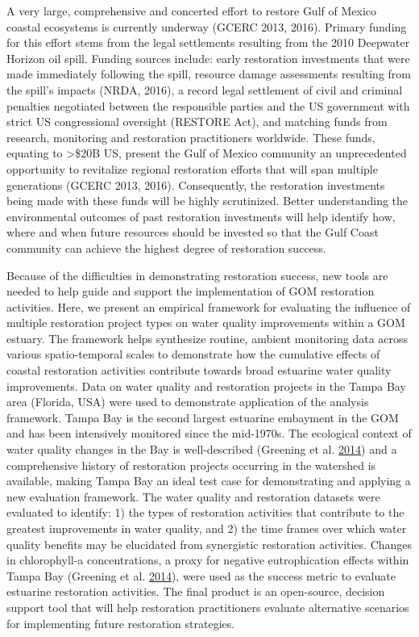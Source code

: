 \documentclass[]{article}
\begin{document}
A very large, comprehensive and concerted effort to restore Gulf of
Mexico coastal ecosystems is currently underway (GCERC 2013, 2016).
Primary funding for this effort stems from the legal settlements
resulting from the 2010 Deepwater Horizon oil spill. Funding sources
include: early restoration investments that were made immediately
following the spill, resource damage assessments resulting from the
spill's impacts (NRDA, 2016), a record legal settlement of civil and
criminal penalties negotiated between the responsible parties and the US
government with strict US congressional oversight (RESTORE Act), and
matching funds from research, monitoring and restoration practitioners
worldwide. These funds, equating to \textgreater{}\$20B US, present the
Gulf of Mexico community an unprecedented opportunity to revitalize
regional restoration efforts that will span multiple generations (GCERC
2013, 2016). Consequently, the restoration investments being made with
these funds will be highly scrutinized. Better understanding the
environmental outcomes of past restoration investments will help
identify how, where and when future resources should be invested so that
the Gulf Coast community can achieve the highest degree of restoration
success.

Because of the difficulties in demonstrating restoration success, new
tools are needed to help guide and support the implementation of GOM
restoration activities. Here, we present an empirical framework for
evaluating the influence of multiple restoration project types on water
quality improvements within a GOM estuary. The framework helps
synthesize routine, ambient monitoring data across various
spatio-temporal scales to demonstrate how the cumulative effects of
coastal restoration activities contribute towards broad estuarine water
quality improvements. Data on water quality and restoration projects in
the Tampa Bay area (Florida, USA) were used to demonstrate application
of the analysis framework. Tampa Bay is the second largest estuarine
embayment in the GOM and has been intensively monitored since the
mid-1970s. The ecological context of water quality changes in the Bay is
well-described (Greening et al.
\protect\hyperlink{ref-Greening2014}{2014}) and a comprehensive history
of restoration projects occurring in the watershed is available, making
Tampa Bay an ideal test case for demonstrating and applying a new
evaluation framework. The water quality and restoration datasets were
evaluated to identify: 1) the types of restoration activities that
contribute to the greatest improvements in water quality, and 2) the
time frames over which water quality benefits may be elucidated from
synergistic restoration activities. Changes in chlorophyll-a
concentrations, a proxy for negative eutrophication effects within Tampa
Bay (Greening et al. \protect\hyperlink{ref-Greening2014}{2014}), were
used as the success metric to evaluate estuarine restoration activities.
The final product is an open-source, decision support tool that will
help restoration practitioners evaluate alternative scenarios for
implementing future restoration strategies.
\end{document}
